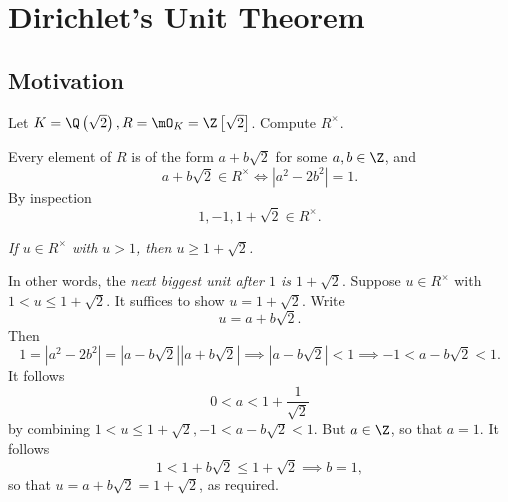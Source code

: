 \documentclass[pmath441]{subfiles}
\begin{document}
    \section{Dirichlet's Unit Theorem}

    \subsection{Motivation}
    
    \begin{example}{}
        Let $K=\Q\left( \sqrt{2} \right), R = \mO_K = \Z\left[ \sqrt{2} \right]$. Compute $R^\times$.
    \end{example}

    \begin{answer}
        Every element of $R$ is of the form $a+b\sqrt{2}$ for some $a,b\in\Z$, and
        \begin{equation*}
            a+b\sqrt{2}\in R^\times \iff \left| a^{2}-2b^{2} \right| = 1.
        \end{equation*}
        By inspection
        \begin{equation*}
            1,-1,1+\sqrt{2}\in R^\times.
        \end{equation*}

        \begin{claim}
            \textit{If $u\in R^\times$ with $u>1$, then $u\geq 1+\sqrt{2}$.}

            In other words, the \textit{next biggest unit after $1$ is $1+\sqrt{2}$}. Suppose $u\in R^\times$ with $1<u\leq 1+\sqrt{2}$. It suffices to show $u=1+\sqrt{2}$. Write
            \begin{equation*}
                u = a+b\sqrt{2}.
            \end{equation*}
            Then
            \begin{equation*}
                1 = \left| a^{2}-2b^{2} \right| = \left| a-b\sqrt{2} \right|\left| a+b\sqrt{2} \right| \implies \left| a-b\sqrt{2} \right| < 1 \implies -1<a-b\sqrt{2}<1.
            \end{equation*}
            It follows
            \begin{equation*}
                0 < a < 1+\frac{1}{\sqrt{2}}
            \end{equation*}
            by combining $1<u\leq 1+\sqrt{2}, -1<a-b\sqrt{2}<1$. But $a\in\Z$, so that $a = 1$. It follows
            \begin{equation*}
                1 < 1+b\sqrt{2}\leq 1+\sqrt{2} \implies b = 1,
            \end{equation*}
            so that $u=a+b\sqrt{2} = 1+\sqrt{2}$, as required.
        \end{claim}


\end{answer}
\end{document}
